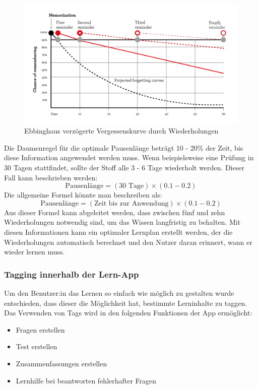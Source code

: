 \begin{figure}[H]
  \centering
  \includegraphics[width=1\textwidth]{images/diagramme/Delayed_Forgetting_Curve.png}
  \caption{Ebbinghaus verzögerte Vergessenskurve durch Wiederholungen}
  \label{fig:EbbinghausVerzoegerteVergesseneskurve}
\end{figure}

\noindent
Die Daumenregel für die optimale Pausenlänge beträgt 10 - 20\% der Zeit, bis diese Information angewendet werden muss. Wenn beispielsweise eine Prüfung in 30 Tagen stattfindet, sollte der Stoff alle 3 - 6 Tage wiederholt werden. \cite[160]{beck_das_neue_lernen_heißt_verstehen}  Dieser Fall kann beschrieben werden: 
\[ \text{{Pausenlänge}} = (\text{{30 Tage}}) \times (0.1 - 0.2) \]
\noindent
Die allgemeine Formel könnte man beschreiben als: 
\[ \text{{Pausenlänge}} = (\text{{Zeit bis zur Anwendung}}) \times (0.1 - 0.2) \]
\newpage
\noindent
Aus dieser Formel kann abgeleitet werden, dass zwischen fünf und zehn Wiederholungen notwendig sind, um das Wissen langfristig zu behalten. \cite[160]{beck_das_neue_lernen_heißt_verstehen} Mit diesen Informationen kann ein optimaler Lernplan erstellt werden, der die Wiederholungen automatisch berechnet und den Nutzer daran erinnert, wann er wieder lernen muss.

\subsubsection{Tagging innerhalb der Lern-App}
Um den Benutzer:in das Lernen so einfach wie möglich zu gestalten wurde entschieden, dass dieser die Möglichkeit hat, bestimmte Lerninhalte zu taggen. Das Verwenden von Tags wird in den folgenden Funktionen der App ermöglicht:
\begin{itemize}
  \item Fragen erstellen
  \item Test erstellen
  \item Zusammenfassungen erstellen
  \item Lernhilfe bei beantworten fehlerhafter Fragen
\end{itemize}

